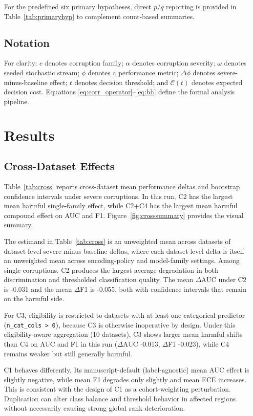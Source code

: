 \documentclass{AuthorGuide/ijitcs}
\begin{document}
For the predefined six primary hypotheses, direct $p$/$q$ reporting is provided in Table~\ref{tab:primaryhyp} to complement count-based summaries.

\subsection{Notation}
For clarity: $c$ denotes corruption family; $\alpha$ denotes corruption severity; $\omega$ denotes seeded stochastic stream; $\phi$ denotes a performance metric; $\Delta\phi$ denotes severe-minus-baseline effect; $t$ denotes decision threshold; and $\mathcal{C}(t)$ denotes expected decision cost. Equations \eqref{eq:corr_operator}--\eqref{eq:bh} define the formal analysis pipeline.

\section{Results}
\subsection{Cross-Dataset Effects}
Table~\ref{tab:cross} reports cross-dataset mean performance deltas and bootstrap confidence intervals under severe corruptions. In this run, C2 has the largest mean harmful single-family effect, while C2+C4 has the largest mean harmful compound effect on AUC and F1. Figure~\ref{fig:crosssummary} provides the visual summary.

The estimand in Table~\ref{tab:cross} is an unweighted mean across datasets of dataset-level severe-minus-baseline deltas, where each dataset-level delta is itself an unweighted mean across encoding-policy and model-family settings. Among single corruptions, C2 produces the largest average degradation in both discrimination and thresholded classification quality. The mean $\Delta$AUC under C2 is -0.031 and the mean $\Delta$F1 is -0.055, both with confidence intervals that remain on the harmful side.

For C3, eligibility is restricted to datasets with at least one categorical predictor (\texttt{n\_cat\_cols > 0}), because C3 is otherwise inoperative by design. Under this eligibility-aware aggregation (10 datasets), C3 shows larger mean harmful shifts than C4 on AUC and F1 in this run ($\Delta$AUC -0.013, $\Delta$F1 -0.023), while C4 remains weaker but still generally harmful.

C1 behaves differently. Its manuscript-default (label-agnostic) mean AUC effect is slightly negative, while mean F1 degrades only slightly and mean ECE increases. This is consistent with the design of C1 as a cohort-weighting perturbation. Duplication can alter class balance and threshold behavior in affected regions without necessarily causing strong global rank deterioration.
\end{document}

